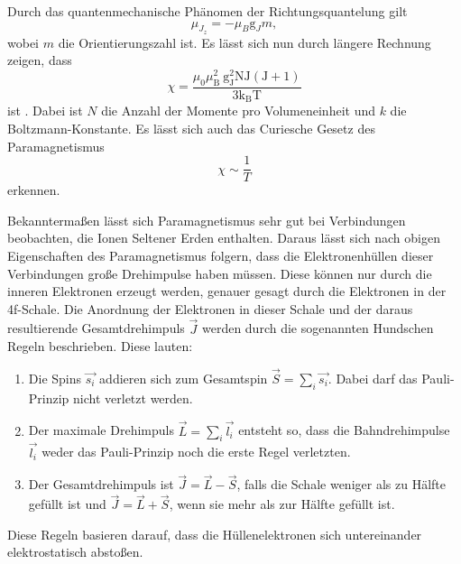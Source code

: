 Durch das quantenmechanische Phänomen der Richtungsquantelung gilt
\begin{equation*}
    \mu_{J_z} = - \mu_B \text{g}_J m,
\end{equation*}
wobei $m$ die Orientierungszahl ist.
Es lässt sich nun durch längere Rechnung zeigen, dass
\begin{equation}\label{eq:susz_theo}
    \chi=\frac{\mu_{0} \mu_{\mathrm{B}}^{2} \mathrm{~g}_{\mathrm{J}}^{2} \mathrm{NJ}(\mathrm{J}+1)}{3 \mathrm{k_B T}}
\end{equation}
ist \cite{v606}.
Dabei ist $N$ die Anzahl der Momente pro Volumeneinheit und $k$ die Boltzmann-Konstante.
Es lässt sich auch das Curiesche Gesetz des Paramagnetismus
\begin{equation}
    \chi \sim \frac{1}{T}
\end{equation}
erkennen.

Bekanntermaßen lässt sich Paramagnetismus sehr gut bei Verbindungen beobachten, die Ionen Seltener Erden enthalten.
Daraus lässt sich nach obigen Eigenschaften des Paramagnetismus folgern, dass die Elektronenhüllen dieser Verbindungen große Drehimpulse haben müssen.
Diese können nur durch die inneren Elektronen erzeugt werden, genauer gesagt durch die Elektronen in der 4f-Schale.
Die Anordnung der Elektronen in dieser Schale und der daraus resultierende Gesamtdrehimpuls $\vec{J}$ werden durch die sogenannten Hundschen Regeln beschrieben.
Diese lauten:
\begin{enumerate}
    \item Die Spins $\vec{s_i}$ addieren sich zum Gesamtspin $\vec{S} = \sum_i \vec{s_i}$. Dabei darf das Pauli-Prinzip nicht verletzt werden.
    \item Der maximale Drehimpuls $\vec{L} = \sum_i \vec{l_i}$ entsteht so, dass die Bahndrehimpulse $\vec{l_i}$ weder das Pauli-Prinzip noch die erste Regel verletzten.
    \item Der Gesamtdrehimpuls ist $\vec{J} = \vec{L} - \vec{S}$, falls die Schale weniger als zu Hälfte gefüllt ist und $\vec{J} = \vec{L} + \vec{S}$, wenn sie mehr als zur Hälfte gefüllt ist.
\end{enumerate}
Diese Regeln basieren darauf, dass die Hüllenelektronen sich untereinander elektrostatisch abstoßen.



